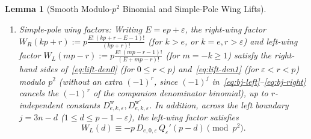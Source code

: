 \documentclass[11pt,reqno]{amsart}
\newtheorem{lemma}[theorem]{Lemma}
\theoremstyle{definition}
\theoremstyle{remark}
\begin{document}
\begin{lemma}[Smooth Modulo-$p^2$ Binomial and Simple-Pole Wing Lifts]
\begin{enumerate}
  \item[\emph{(c)}] \emph{Simple-pole wing factors:} Writing $E = ep + \varepsilon$, the right-wing factor $W_R(kp+r) := p\frac{E!\,(kp+r-E-1)!}{(kp+r)!}$ (for $k > e$, or $k = e, r > \varepsilon$) and left-wing factor $W_L(mp-r) := p\frac{E!\,(mp-r-1)!}{(E+mp-r)!}$ (for $m = -k \ge 1$) satisfy the right-hand sides of~\eqref{eq:lift-den0} (for $0 \le r < p$) and~\eqref{eq:lift-den1} (for $\varepsilon < r < p$) modulo $p^2$ (without an extra $(-1)^r$, since $(-1)^j$ in~\eqref{eq:bj-left}--\eqref{eq:bj-right} cancels the $(-1)^r$ of the companion denominator binomial), up to $r$-independent constants $D^{\mathrm{w}}_{e,k,\varepsilon}, D^{\mathrm{w}\prime}_{e,k,\varepsilon}$. In addition, across the left boundary $j = 3n - d$ ($1 \le d \le p - 1 - \varepsilon$), the left-wing factor satisfies
  \begin{equation}
  \label{eq:wing-left-cross}
    W_L(d) \equiv -p\, D_{e,0,\varepsilon}\, Q_\varepsilon'(p - d) \pmod{p^2}.
  \end{equation}
\end{enumerate}
\end{lemma}
\end{document}
